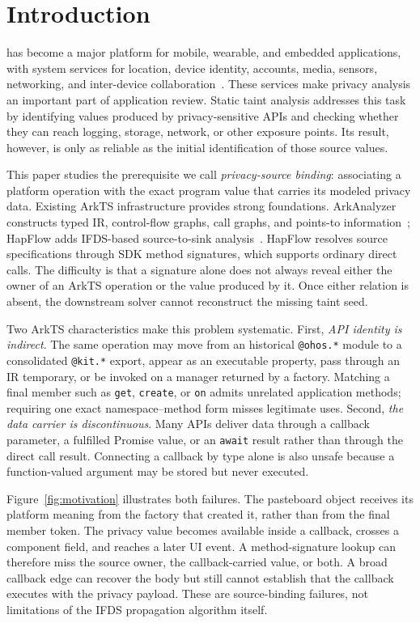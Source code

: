 \section{Introduction}
\label{sec:introduction}

\openharmony has become a major platform for mobile, wearable, and embedded applications, with system services for location, device identity, accounts, media, sensors, networking, and inter-device collaboration~\cite{openharmony,harmonyroadmap,huaweiHarmonyWhitepaper}. These services make privacy analysis an important part of application review. Static taint analysis addresses this task by identifying values produced by privacy-sensitive APIs and checking whether they can reach logging, storage, network, or other exposure points. Its result, however, is only as reliable as the initial identification of those source values.

This paper studies the prerequisite we call \emph{privacy-source binding}: associating a platform operation with the exact program value that carries its modeled privacy data. Existing ArkTS infrastructure provides strong foundations. ArkAnalyzer constructs typed IR, control-flow graphs, call graphs, and points-to information~\cite{arkanalyzer}; HapFlow adds IFDS-based source-to-sink analysis~\cite{hapflow}. HapFlow resolves source specifications through SDK method signatures, which supports ordinary direct calls. The difficulty is that a signature alone does not always reveal either the owner of an ArkTS operation or the value produced by it. Once either relation is absent, the downstream solver cannot reconstruct the missing taint seed.

Two ArkTS characteristics make this problem systematic. First, \emph{API identity is indirect}. The same operation may move from an historical \texttt{@ohos.*} module to a consolidated \texttt{@kit.*} export, appear as an executable property, pass through an IR temporary, or be invoked on a manager returned by a factory. Matching a final member such as \texttt{get}, \texttt{create}, or \texttt{on} admits unrelated application methods; requiring one exact namespace--method form misses legitimate uses. Second, \emph{the data carrier is discontinuous}. Many APIs deliver data through a callback parameter, a fulfilled Promise value, or an \texttt{await} result rather than through the direct call result. Connecting a callback by type alone is also unsafe because a function-valued argument may be stored but never executed.

Figure~\ref{fig:motivation} illustrates both failures. The pasteboard object receives its platform meaning from the factory that created it, rather than from the final member token. The privacy value becomes available inside a callback, crosses a component field, and reaches a later UI event. A method-signature lookup can therefore miss the source owner, the callback-carried value, or both. A broad callback edge can recover the body but still cannot establish that the callback executes with the privacy payload. These are source-binding failures, not limitations of the IFDS propagation algorithm itself.

